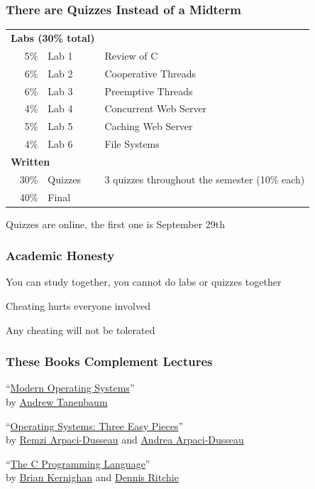   \begin{frame}
    \frametitle{There are Quizzes Instead of a Midterm}

    \begin{tabular}{rll}
      \multicolumn{2}{l}{\bfseries Labs (30\% total)} \\
       5\% & Lab 1 & Review of C \\
       6\% & Lab 2 & Cooperative Threads \\
       6\% & Lab 3 & Preemptive Threads \\
       4\% & Lab 4 & Concurrent Web Server \\
       5\% & Lab 5 & Caching Web Server \\
       4\% & Lab 6 & File Systems \\
      \multicolumn{2}{l}{\bfseries Written} \\
      30\% & Quizzes & 3 quizzes throughout the semester (10\% each) \\
      40\% & Final & \\
    \end{tabular}

    Quizzes are online, the first one is September 29th
  \end{frame}

  \begin{frame}
    \frametitle{Academic Honesty}

    You can study together, you cannot do labs or quizzes together

    \vspace{2em}

    Cheating hurts everyone involved

    \vspace{2em}

    Any cheating will not be tolerated
  \end{frame}

  \begin{frame}
    \frametitle{These Books Complement Lectures}

    ``\href{https://www.pearson.com/en-us/subject-catalog/p/modern-operating-systems/P200000003311/9780137538638}
           {Modern Operating Systems}'' \\
    by \href{https://www.cs.vu.nl/~ast/}{Andrew Tanenbaum}

    \vspace{2em}

    ``\href{https://pages.cs.wisc.edu/~remzi/OSTEP/}
           {Operating Systems: Three Easy Pieces}'' \\
    by \href{http://www.cs.wisc.edu/~remzi/}{Remzi Arpaci-Dusseau}
    and \href{http://www.cs.wisc.edu/~dusseau/}{Andrea Arpaci-Dusseau}

    \vspace{2em}

    ``\href{https://en.wikipedia.org/wiki/The_C_Programming_Language}
           {The C Programming Language}'' \\
    by \href{https://en.wikipedia.org/wiki/Brian_Kernighan}{Brian Kernighan}
    and \href{https://en.wikipedia.org/wiki/Dennis_Ritchie}{Dennis Ritchie}
  \end{frame}

